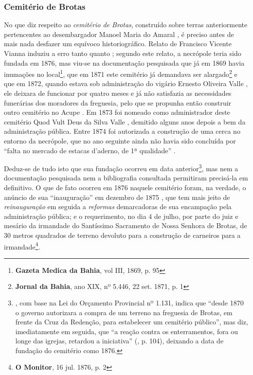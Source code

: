 \subsubsection{Cemitério de Brotas}\label{subsubsec:cemitbro}

No que diz respeito ao \textit{cemitério de Brotas}, construído sobre terras anteriormente pertencentes ao desembargador Manoel Maria do Amaral \cite[relatório da inspetoria de higiene, p.~23]{bahia_rpe_1893}, é preciso antes de mais nada desfazer um equívoco historiográfico. Relato de Francisco Vicente Vianna \cite[p.~371]{vianna_bahia_1893} induziu a erro tanto  quanto ; segundo este relato, a necrópole teria sido fundada em 1876, mas viu-se na documentação pesquisada que já em 1869 havia inumações no local\footnote{\textbf{Gazeta Medica da Bahia}, vol III, 1869, p. 95}, que em 1871 este cemitério já demandava ser alargado\footnote{\textbf{Jornal da Bahia}, ano XIX, nº 5.446, 22 set. 1871, p. 1} e que em 1872, quando estava sob administração do vigário Ernesto Oliveira Valle \cite[segunda~parte, p.~105]{pimenta_almanak_1872}, ele deixara de funcionar por quatro meses e já não satisfazia as necessidades funerárias dos moradores da freguesia, pelo que se propunha então construir outro cemitério no Acupe \cite[relatório do chefe de polícia, p.~12]{bahia_1872}. Em 1873 foi nomeado como administrador deste cemitério Quod Vult Deus da Silva Valle \cite[p.~39]{bahia_rpe_1873a}, demitido alguns anos depois a bem da administração pública. Entre 1874 foi autorizada a construção de uma cerca no entorno da necrópole, que no ano seguinte ainda não havia sido concluída por ``falta no mercado de estacas d'aderno, de 1ª qualidade'' \cite{bahia_rpe_1874,bahia_rpe_1875}.

Deduz-se de tudo isto que sua fundação ocorreu em data anterior\footnote{, com base na Lei do Orçamento Provincial nº 1.131, indica que ``desde 1870 o governo autorizara a compra de um terreno na freguesia de Brotas, em frente da Cruz da Redenção, para estabelecer um cemitério público'', mas diz, imediatamente em seguida, que ``a reação contra os enterramentos, fora ou longe das igrejas, retardou a iniciativa'' (\citeyear{flexor_desenho_1999}, p. 104), deixando a data de fundação do cemitério como 1876.}, mas nem a documentação pesquisada nem a bibliografia consultada permitiram precisá-la em definitivo. O que de fato ocorreu em 1876 naquele cemitério foram, na verdade, o anúncio de sua ``inauguração'' em dezembro de 1875 \cite[p.~54]{bahia_rpe_1876}, que tem mais jeito de \textit{reinauguração} em seguida a \textit{reformas} demarcadoras de sua encampação pela administração pública; e o requerimento, no dia 4 de julho, por parte do juiz e mesário da irmandade do Santíssimo Sacramento de Nossa Senhora de Brotas, de 30 metros quadrados de terreno devoluto para a construção de carneiros para a irmandade\footnote{\textbf{O Monitor}, 16 jul. 1876, p. 2}. 

